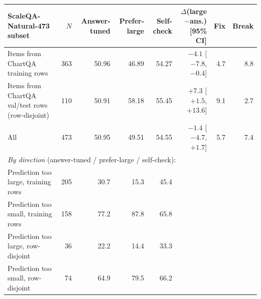 \begin{tabular}{lrrrrrrr}
\toprule
ScaleQA-Natural-473 subset & $N$ & Answer-tuned & Prefer-large & Self-check & $\Delta$(large$-$ans.) [95\% CI] & Fix & Break \\
\midrule
Items from ChartQA training rows & 363 & 50.96 & 46.89 & 54.27 & $-4.1$ [$-7.8$, $-0.4$] & 4.7 & 8.8 \\
Items from ChartQA val/test rows (row-disjoint) & 110 & 50.91 & 58.18 & 55.45 & $+7.3$ [$+1.5$, $+13.6$] & 9.1 & 2.7 \\
All & 473 & 50.95 & 49.51 & 54.55 & $-1.4$ [$-4.7$, $+1.7$] & 5.7 & 7.4 \\
\midrule
\multicolumn{8}{l}{\emph{By direction} (answer-tuned / prefer-large / self-check):} \\
Prediction too large, training rows & 205 & 30.7 & 15.3 & 45.4 & & & \\
Prediction too small, training rows & 158 & 77.2 & 87.8 & 65.8 & & & \\
Prediction too large, row-disjoint & 36 & 22.2 & 14.4 & 33.3 & & & \\
Prediction too small, row-disjoint & 74 & 64.9 & 79.5 & 66.2 & & & \\
\bottomrule
\end{tabular}
